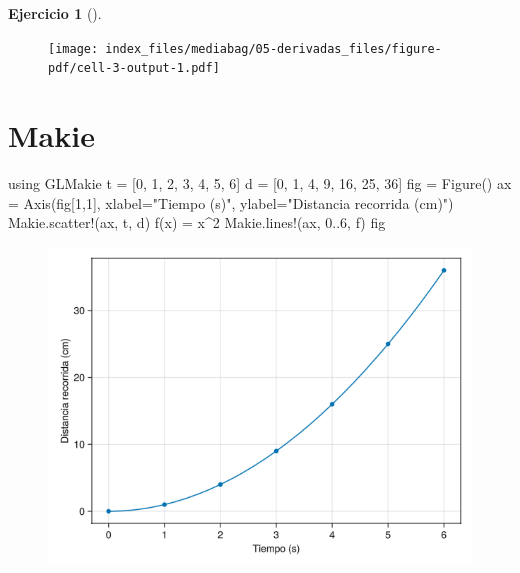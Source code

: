 \documentclass[
  a4paper,
]{scrreport}
\newenvironment{Shaded}{\begin{snugshade}}{\end{snugshade}}
\newcommand{\BuiltInTok}[1]{\textcolor[rgb]{0.00,0.23,0.31}{#1}}
\newcommand{\FloatTok}[1]{\textcolor[rgb]{0.68,0.00,0.00}{#1}}
\newcommand{\FunctionTok}[1]{\textcolor[rgb]{0.28,0.35,0.67}{#1}}
\newcommand{\ImportTok}[1]{\textcolor[rgb]{0.00,0.46,0.62}{#1}}
\newcommand{\NormalTok}[1]{\textcolor[rgb]{0.00,0.23,0.31}{#1}}
\newcommand{\OperatorTok}[1]{\textcolor[rgb]{0.37,0.37,0.37}{#1}}
\newcommand{\StringTok}[1]{\textcolor[rgb]{0.13,0.47,0.30}{#1}}
\theoremstyle{definition}
\newtheorem{exercise}{Ejercicio}[chapter]
\theoremstyle{remark}
\begin{document}
\begin{exercise}[]
\begin{enumerate}
\begin{tcolorbox}
  \begin{figure}[H]

  {\centering \texttt{[image: index\_files/mediabag/05-derivadas\_files/figure-pdf/cell-3-output-1.pdf]}

  }

  \end{figure}

  \section{Makie}

\begin{Shaded}
\begin{Highlighting}[]
\ImportTok{using} \BuiltInTok{GLMakie}
\NormalTok{t }\OperatorTok{=}\NormalTok{ [}\FloatTok{0}\NormalTok{, }\FloatTok{1}\NormalTok{, }\FloatTok{2}\NormalTok{, }\FloatTok{3}\NormalTok{, }\FloatTok{4}\NormalTok{, }\FloatTok{5}\NormalTok{, }\FloatTok{6}\NormalTok{]}
\NormalTok{d }\OperatorTok{=}\NormalTok{ [}\FloatTok{0}\NormalTok{, }\FloatTok{1}\NormalTok{, }\FloatTok{4}\NormalTok{, }\FloatTok{9}\NormalTok{, }\FloatTok{16}\NormalTok{, }\FloatTok{25}\NormalTok{, }\FloatTok{36}\NormalTok{]}
\NormalTok{fig }\OperatorTok{=} \FunctionTok{Figure}\NormalTok{()}
\NormalTok{ax }\OperatorTok{=} \FunctionTok{Axis}\NormalTok{(fig[}\FloatTok{1}\NormalTok{,}\FloatTok{1}\NormalTok{], xlabel}\OperatorTok{=}\StringTok{"Tiempo (s)"}\NormalTok{, ylabel}\OperatorTok{=}\StringTok{"Distancia recorrida (cm)"}\NormalTok{)}
\NormalTok{Makie.}\FunctionTok{scatter!}\NormalTok{(ax, t, d)}
\FunctionTok{f}\NormalTok{(x) }\OperatorTok{=}\NormalTok{ x}\OperatorTok{\^{}}\FloatTok{2}
\NormalTok{Makie.}\FunctionTok{lines!}\NormalTok{(ax, }\FloatTok{0}\OperatorTok{..}\FloatTok{6}\NormalTok{, f)}
\NormalTok{fig}
\end{Highlighting}
\end{Shaded}

  \begin{figure}[H]

  {\centering \includegraphics{05-derivadas_files/figure-pdf/cell-4-output-1.png}

}
\end{figure}
\end{tcolorbox}
\end{enumerate}
\end{exercise}
\end{document}
